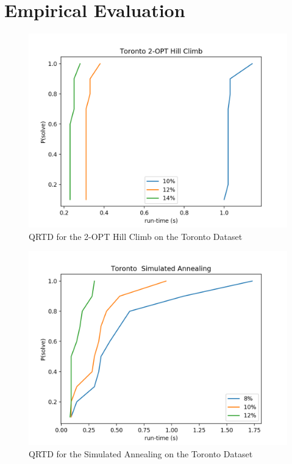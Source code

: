 \documentclass[format=sigconf]{acmart}
\begin{document}
\section*{Empirical Evaluation}
 
 
 
 

\begin{figure}[htbp]
    \centerline{\includegraphics[scale=.5]{graphs/Toronto_LS1_QRTD.png}}
    \caption{QRTD for the 2-OPT Hill Climb on the Toronto Dataset}
    \label{fig:1}
\end{figure}

\begin{figure}[htbp]
    \centerline{\includegraphics[scale=.5]{graphs/Toronto_LS2_QRTD.png}}
    \caption{QRTD for the Simulated Annealing on the Toronto Dataset}
    \label{fig:2}
\end{figure}
\end{document}
